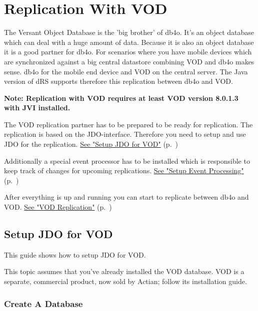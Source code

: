 
\chapter{Replication With VOD}
\label{drs:db4o-replication-system-drs-vod-replication}

The Versant Object Database is the 'big brother' of db4o. It's an object database which can deal with a huge amount of data. Because it is also an object database it is a good partner for db4o. For scenarios where you have mobile devices which are synchronized against a big central datastore combining VOD and db4o makes sense. db4o for the mobile end device and VOD on the central server. The Java version of dRS supports therefore this replication between db4o and VOD.

\textbf{Note: Replication with VOD requires at least VOD version 8.0.1.3 with JVI installed.}

The VOD replication partner has to be prepared to be ready for replication. The replication is based on the JDO-interface. Therefore you need to setup and use JDO for the replication. \hyperref[drs:db4o-replication-system-drs-vod-setup]{See "Setup JDO for VOD"} (p.~\pageref{drs:db4o-replication-system-drs-vod-setup})

Additionally a special event processor has to be installed which is responsible to keep track of changes for upcoming replications. \hyperref[drs:db4o-replication-system-drs-vod-setup-event-processing]{See "Setup Event Processing"} (p.~\pageref{drs:db4o-replication-system-drs-vod-setup-event-processing})

After everything is up and running you can start to replicate between db4o and VOD. \hyperref[drs:db4o-replication-system-drs-vod-vod-replication]{See "VOD Replication"} (p.~\pageref{drs:db4o-replication-system-drs-vod-vod-replication})

\section{Setup JDO for VOD}
\label{drs:db4o-replication-system-drs-vod-setup}

This guide shows how to setup JDO for VOD.

This topic assumes that you've already installed the VOD database. VOD is a separate, commercial product, now sold by Actian; follow its installation guide.

\subsection{Create A Database}
\label{drs:db4o-replication-system-drs-vod-setup:createdb}

